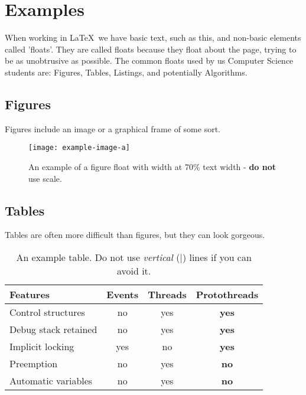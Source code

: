 \chapter{Examples}\label{app:examples}
When working in \LaTeX\ we have basic text, such as this, and non-basic elements called 'floats'. They are called floats because they float about the page, trying to be as unobtrusive as possible. The common floats used by us Computer Science students are: Figures, Tables, Listings, and potentially Algorithms.

\section{Figures}
Figures include an image or a graphical frame of some sort.


\begin{figure}[htb!]
    \centering
    \texttt{[image: example-image-a]}
    \caption{An example of a figure float with width at 70\% text width - \textbf{do not} use scale.}
    \label{fig:example-image-1}
\end{figure}


\clearpage
\section{Tables}
Tables are often more difficult than figures, but they can look gorgeous.


\begin{table}[htb!]
    \centering
    \begin{tabular}{lcc>{\bfseries}c}
        \toprule
        Features             & Events & Threads & Protothreads \\
        \midrule
        Control structures   & no     & yes     & yes          \\
        Debug stack retained & no     & yes     & yes          \\
        Implicit locking     & yes    & no      & yes          \\
        Preemption           & no     & yes     & no           \\
        Automatic variables  & no     & yes     & no           \\
        \bottomrule
    \end{tabular}
    \caption{An example table. Do not use \textit{vertical} (|) lines if you can avoid it.}
    \label{tab:example-table-1}
\end{table}


